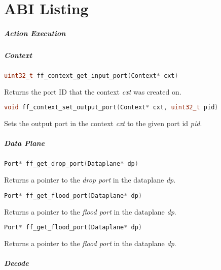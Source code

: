 \chapter{ABI Listing}
\label{abi-listing}

\paragraph{Action Execution}



\paragraph{Context}

\begin{lstlisting}[language=c++]
uint32_t ff_context_get_input_port(Context* cxt)
\end{lstlisting}
Returns the port ID that the context \emph{cxt} was created on.


\begin{lstlisting}[language=c++]
void ff_context_set_output_port(Context* cxt, uint32_t pid)
\end{lstlisting}
Sets the output port in the context \emph{cxt} to the given port id \emph{pid}.

\paragraph{Data Plane}

\begin{lstlisting}[language=c++]
Port* ff_get_drop_port(Dataplane* dp)
\end{lstlisting}
Returns a pointer to the \emph{drop port} in the dataplane \emph{dp}.


\begin{lstlisting}[language=c++]
Port* ff_get_flood_port(Dataplane* dp)
\end{lstlisting}
Returns a pointer to the \emph{flood port} in the dataplane \emph{dp}.

\begin{lstlisting}[language=c++]
Port* ff_get_flood_port(Dataplane* dp)
\end{lstlisting}
Returns a pointer to the \emph{flood port} in the dataplane \emph{dp}.

\paragraph{Decode}

